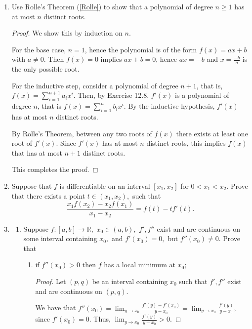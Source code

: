 \documentclass[11pt]{article}
\newcommand{\bbR}{\mathbb{R}}
\renewcommand{\_}[1]{\underline{ #1 }}
\theoremstyle{definition}
\numberwithin{equation}{subsection}
\begin{document}
\begin{enumerate}
\item
Use Rolle's Theorem (\ref{Rolle}) to show that a polynomial of degree $n\geq 1$ has at most $n$ distinct roots.


\begin{proof}
We show this by induction on $n$.

For the base case, $n=1$, hence the polynomial is of the form $f(x)=ax+b$ with $a\neq 0$. Then $f(x)=0$ implies $ax+b=0$, hence $ax=-b$ and $x=\frac{-b}{a}$ is the only possible root. 

For the inductive step, consider a polynomial of degree $n+1$, that is, $f(x)=\sum_{i=1}^{n+1} a_i x^i$. Then, by Exercise 12.8, $f'(x)$ is a polynomial of degree $n$, that is $f(x)=\sum_{i=1}^{n} b_i x^i$. By the inductive hypothesis, $f'(x)$ has at most $n$ distinct roots.

By Rolle's Theorem, between any two roots of $f(x)$ there exists at least one root of $f'(x)$. Since $f'(x)$ has at most $n$ distinct roots, this implies $f(x)$ that has at most $n+1$ distinct roots. 

This completes the proof.

\renewcommand\qedsymbol{QED}
\end{proof}



\item Suppose that $f$ is differentiable on an interval $[x_1,x_2]$ for $0<x_1<x_2.$ Prove that there exists a point $t \in (x_1,x_2),$ such that
$$
\frac{x_1f(x_2)-x_2f(x_1)}{x_1-x_2}=f(t)-tf'(t).
$$ 

\item 
\begin{enumerate}
\item Suppose $f\colon [a,b]\to \bbR,$ $x_0\in (a,b),$  $f',f''$ exist and are continuous on some interval containing $x_0,$ and $f'(x_0)=0,$ but $f''(x_0)\neq 0.$ 
Prove that 
\begin{enumerate}
\item[i)]if $f''(x_0)>0$ then $f$ has a local minimum at $x_0;$ 

\begin{proof}
Let $(p,q)$ be an interval containing $x_0$ such that $f',f''$ exist and are continuous on $(p,q)$. 

We have that $f''(x_0)=\lim_{y \to x_0} \frac{f'(y)-f'(x_0)}{y-x_0} = \lim_{y \to x_0} \frac{f'(y)}{y-x_0}$, since $f'(x_0)=0$. Thus, $\lim_{y \to x_0} \frac{f'(y)}{y-x_0}>0$. 


\end{proof}
\end{enumerate}
\end{enumerate}
\end{enumerate}
\end{document}
